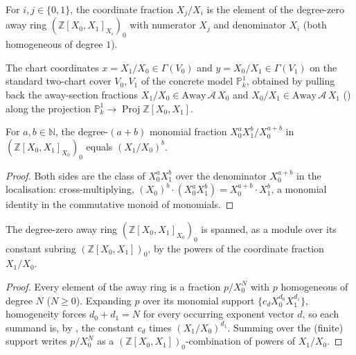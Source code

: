 \begin{definition}
  \label{def:adelic_p1CoordAway}
  \leanok
  For \(i, j \in \{0, 1\}\), the coordinate fraction \(X_j/X_i\) is the
  element of the degree-zero away ring \((\mathbb{Z}[X_0,X_1]_{X_i})_0\)
  with numerator \(X_j\) and denominator \(X_i\) (both homogeneous of
  degree \(1\)).
\end{definition}

\begin{definition}
  \label{def:adelic_p1_chart_sections}
  \leanok
  The chart coordinates \(x = X_1/X_0 \in \Gamma(V_0)\) and
  \(y = X_0/X_1 \in \Gamma(V_1)\) on the standard two-chart cover
  \(V_0, V_1\) of the concrete model \(\mathbb{P}^1_k\), obtained by
  pulling back the away-section fractions
  \(X_1/X_0 \in \mathrm{Away}\,\mathcal A\,X_0\) and
  \(X_0/X_1 \in \mathrm{Away}\,\mathcal A\,X_1\)
  () along the projection
  \(\mathbb{P}^1_k \to \operatorname{Proj}\mathbb{Z}[X_0,X_1]\).
\end{definition}

\begin{lemma}
  \label{lem:adelic_p1Monomial_eq_coordPow}
  \leanok
  For \(a, b \in \mathbb{N}\), the degree-\((a+b)\) monomial fraction
  \(X_0^a X_1^b / X_0^{a+b}\) in \((\mathbb{Z}[X_0,X_1]_{X_0})_0\) equals
  \((X_1/X_0)^b\).
\end{lemma}
\begin{proof}
  \leanok
  Both sides are the class of \(X_0^a X_1^b\) over the denominator
  \(X_0^{a+b}\) in the localisation: cross-multiplying,
  \((X_0)^b \cdot (X_0^a X_1^b) = X_0^{a+b} \cdot X_1^b\), a monomial
  identity in the commutative monoid of monomials.
\end{proof}

\begin{theorem}
  \label{thm:adelic_span_p1CoordAway_pow_top}
  \leanok
  The degree-zero away ring \((\mathbb{Z}[X_0,X_1]_{X_0})_0\) is spanned,
  as a module over its constant subring \((\mathbb{Z}[X_0,X_1])_0\), by
  the powers of the coordinate fraction \(X_1/X_0\).
\end{theorem}
\begin{proof}
  \leanok
  Every element of the away ring is a fraction \(p/X_0^N\) with \(p\)
  homogeneous of degree \(N\) (\(N \ge 0\)). Expanding \(p\) over its
  monomial support \(\{c_d X_0^{d_0} X_1^{d_1}\}\), homogeneity forces
  \(d_0 + d_1 = N\) for every occurring exponent vector \(d\), so each
  summand is, by , the constant
  \(c_d\) times \((X_1/X_0)^{d_1}\). Summing over the (finite) support
  writes \(p/X_0^N\) as a \((\mathbb{Z}[X_0,X_1])_0\)-combination of
  powers of \(X_1/X_0\).
\end{proof}

